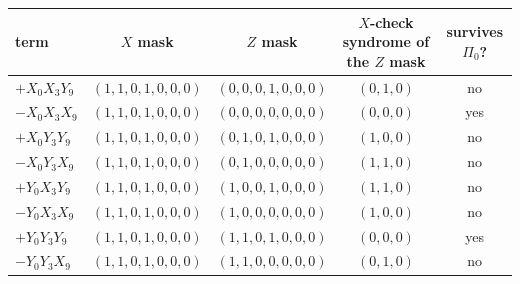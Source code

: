 \begin{tabular}{lcccc}\toprule
term & $X$ mask & $Z$ mask & $X$-check syndrome of the $Z$ mask & survives $\Pi_0$? \\\midrule
$+X_0X_3Y_9$ & $(1,1,0,1,0,0,0)$ & $(0,0,0,1,0,0,0)$ & $(0,1,0)$ & no \\
$-X_0X_3X_9$ & $(1,1,0,1,0,0,0)$ & $(0,0,0,0,0,0,0)$ & $(0,0,0)$ & yes \\
$+X_0Y_3Y_9$ & $(1,1,0,1,0,0,0)$ & $(0,1,0,1,0,0,0)$ & $(1,0,0)$ & no \\
$-X_0Y_3X_9$ & $(1,1,0,1,0,0,0)$ & $(0,1,0,0,0,0,0)$ & $(1,1,0)$ & no \\
$+Y_0X_3Y_9$ & $(1,1,0,1,0,0,0)$ & $(1,0,0,1,0,0,0)$ & $(1,1,0)$ & no \\
$-Y_0X_3X_9$ & $(1,1,0,1,0,0,0)$ & $(1,0,0,0,0,0,0)$ & $(1,0,0)$ & no \\
$+Y_0Y_3Y_9$ & $(1,1,0,1,0,0,0)$ & $(1,1,0,1,0,0,0)$ & $(0,0,0)$ & yes \\
$-Y_0Y_3X_9$ & $(1,1,0,1,0,0,0)$ & $(1,1,0,0,0,0,0)$ & $(0,1,0)$ & no \\
\bottomrule\end{tabular}

